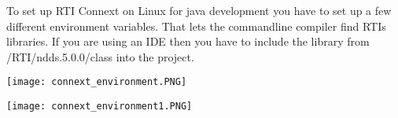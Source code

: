 To set up RTI Connext on Linux for java development you have to set up a few different environment variables. That lets the commandline compiler find RTIs libraries. If you are using an IDE then you have to include the library from /RTI/ndds.5.0.0/class into the project.

\begin{center}
	\texttt{[image: connext\_environment.PNG]}
\end{center}

\begin{center}
	\texttt{[image: connext\_environment1.PNG]}
\end{center}
